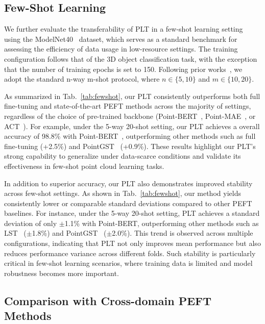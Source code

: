 

\subsection{Few-Shot Learning}
\label{sec:few_shot}

We further evaluate the transferability of PLT in a few-shot learning setting using the ModelNet40~\cite{wu20153d} dataset, which serves as a standard benchmark for assessing the efficiency of data usage in low-resource settings. The training configuration follows that of the 3D object classification task, with the exception that the number of training epochs is set to 150. Following prior works~\cite{zha2023instance, zhou2024dynamic}, we adopt the standard n-way m-shot protocol, where $n \in \{5, 10\}$ and $m \in \{10, 20\}$.

As summarized in Tab.~\ref{tab:fewshot}, our PLT consistently outperforms both full fine-tuning and state-of-the-art PEFT methods across the majority of settings, regardless of the choice of pre-trained backbone (Point-BERT~\cite{yu2022point}, Point-MAE~\cite{pang2022masked}, or ACT~\cite{dong2022autoencoders}). For example, under the 5-way 20-shot setting, our PLT achieves a overall accuracy of 98.8\% with Point-BERT~\cite{yu2022point}, outperforming other methods such as full fine-tuning (+2.5\%) and PointGST~\cite{liang2024parameter} (+0.9\%). These results highlight our PLT's strong capability to generalize under data-scarce conditions and validate its effectiveness in few-shot point cloud learning tasks.

In addition to superior accuracy, our PLT also demonstrates improved stability across few-shot settings. As shown in Tab.~\ref{tab:fewshot}, our method yields consistently lower or comparable standard deviations compared to other PEFT baselines. For instance, under the 5-way 20-shot setting, PLT achieves a standard deviation of only $\pm$1.1\% with Point-BERT, outperforming other methods such as LST~\cite{sung2022lst} ($\pm$1.8\%) and PointGST~\cite{liang2024parameter} ($\pm$2.0\%). This trend is observed across multiple configurations, indicating that PLT not only improves mean performance but also reduces performance variance across different folds. Such stability is particularly critical in few-shot learning scenarios, where training data is limited and model robustness becomes more important.

\subsection{Comparison with Cross-domain PEFT Methods}
\label{sec:compare}

